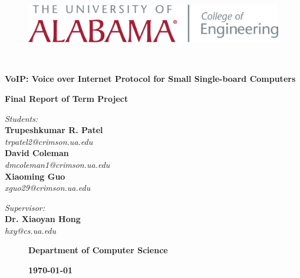 \begin{titlepage}
	\begin{figure}[t]
		\begin{minipage}{\textwidth}
			\centering
			\includegraphics[scale=0.35]{Images/UA/OfficLogo-Engineering.png}
		\end{minipage}
	\end{figure}

	\quad\\
	\vspace{0.5in}
	\centering
	\begin{spacing}{2.0}
		{ \textbf{\LARGE VoIP: Voice over Internet Protocol for Small Single-board Computers}}
	\end{spacing}
	
	\vspace{1.5in}
	\textbf{\Large Final Report of Term Project}
	\vspace{3.0in}

	\begin{minipage}{0.49\textwidth}
		\begin{flushleft}
			\textit{{Students:}} \\
			{\textbf{Trupeshkumar R. Patel}}\\
			\textsl{trpatel2@crimson.ua.edu}\\
			{\textbf{David Coleman}}\\
			\textsl{dmcoleman1@crimson.ua.edu}\\
			{\textbf{Xiaoming Guo}}\\
			\textsl{xguo29@crimson.ua.edu}
		\end{flushleft}
	\end{minipage}
	\begin{minipage}{0.5\textwidth}
		\begin{flushright}
			\textit{{Supervisor:}} \\
			{\textbf{Dr. Xiaoyan Hong}}\\
			\textsl{hxy@cs.ua.edu}
		\end{flushright}
	\end{minipage}

	\begin{figure}[b]
		\begin{minipage}{0.55\textwidth}
			\begin{flushleft}
				\textbf{\large Department of Computer Science}
			\end{flushleft}
		\end{minipage}
		\hfill
		\begin{minipage}{0.35\textwidth}
			\begin{flushright}
				\textsc{\textbf{\today}}
			\end{flushright}
		\end{minipage}
	\end{figure}

\end{titlepage}